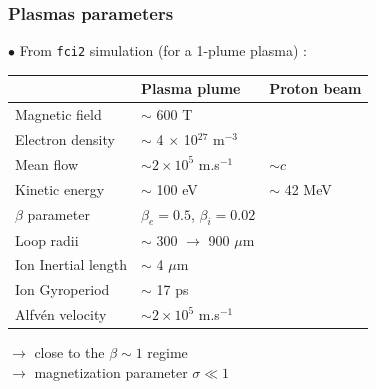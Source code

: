 \documentclass{beamer}
\begin{document}
\begin{frame}
\frametitle{Plasmas parameters}

$\bullet$ From \texttt{fci2} simulation (for a 1-plume plasma) :

\begin{center}
\begin{tabular}{lll}
\hline
\hline
& Plasma plume & Proton beam \hspace{2.0cm}\\
\hline
Magnetic field             & $\sim$ 600 T                               & \\
Electron density           & $\sim$ 4 $\times$ 10$^{27}$ m$^{-3}$       & \\
Mean flow                  & $\sim 2 \times 10^5$ m.s$^{-1}$            & $\sim c$ \\
Kinetic energy             & $\sim$ 100 eV                              & $\sim$ 42 MeV \\
$\beta$ parameter          & $\beta_e = 0.5$, $\beta_i = 0.02$          & \\
Loop radii                 & $\sim$ 300 $\to$ 900 $\mu$m                & \\
Ion Inertial length        & $\sim$ 4 $\mu$m                            & \\
Ion Gyroperiod             & $\sim$ 17 ps                               & \\
Alfvén velocity            & $\sim 2 \times 10^5$ m.s$^{-1}$            & \\
\hline
\hline
\end{tabular}
\end{center}

$\to$ close to the $\beta \sim 1$ regime \\
$\to$ magnetization parameter $\sigma \ll 1$ \\

\end{frame}



\end{document}
